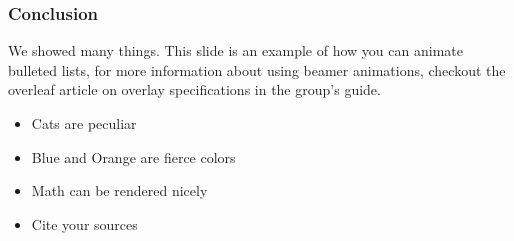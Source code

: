 \begin{frame}
  \frametitle{Conclusion}
        We showed many things. This slide is an example of how 
        you can animate bulleted lists, for more information about
        using beamer animations, checkout the overleaf article on 
        overlay specifications in the group's guide.
        \begin{itemize}
                \item Cats are peculiar
                \pause
                \item Blue and Orange are fierce colors
                \pause
                \item Math can be rendered nicely
                \pause
                \item Cite your sources
        \end{itemize}

\end{frame}
